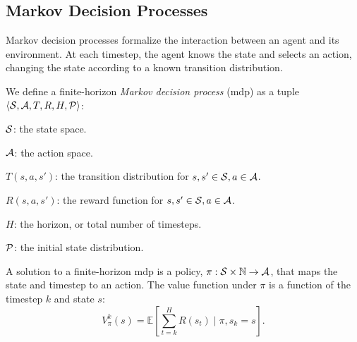 





\subsection{Markov Decision Processes}
Markov decision processes formalize the interaction
between an agent and its environment. At each timestep, the
agent knows the state and selects an action, changing the
state according to a known transition distribution.
\begin{defn}
We define a finite-horizon \emph{Markov decision process} ({\sc mdp}) as a tuple $\langle \mathcal{S}, \mathcal{A}, T,
R, H, \mathcal{P} \rangle$:
\begin{tightlist}
\item $\mathcal{S}$: the state space.
\item $\mathcal{A}$: the action space.
\item $T(s, a, s')$: the transition distribution for $s, s' \in \mathcal{S}, a \in \mathcal{A}$.
\item $R(s, a, s')$: the reward function for $s, s' \in \mathcal{S}, a \in \mathcal{A}$.
\item $H$: the horizon, or total number of timesteps.
\item $\mathcal{P}$: the initial state distribution.
\end{tightlist}
\end{defn}
A solution to a finite-horizon {\sc mdp} is a policy, $\pi: \mathcal{S} \times \mathbb{N} \rightarrow \mathcal{A}$,
that maps the state and timestep to an action.  The
value function under $\pi$ is a function of the timestep $k$ and state
$s$:
$$V_{\pi}^{k}(s) = \mathbb{E}\left[\sum_{t=k}^{H}R(s_{t}) \mid \pi, s_{k} = s\right].$$

